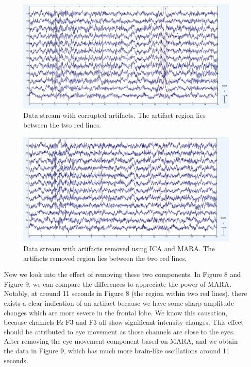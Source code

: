 \documentclass[a4paper,11pt,oneside]{article}
\begin{document}
		\begin{figure}[!h]
			\begin{center}
				\includegraphics[width=\textwidth]{img/art}
			\end{center}
			\caption{Data stream with corrupted artifacts. The artifact region lies between the two red lines.}
		\end{figure}
				\begin{figure}[!h]
		\begin{center}
			\includegraphics[width=\textwidth]{img/artrm}
		\end{center}
		\caption{Data stream with artifacts removed using ICA and MARA. The artifacts removed region lies between the two red lines.}
	\end{figure}
	Now we look into the effect of removing these two components. In Figure 8 and Figure 9, we can compare the differences to appreciate the power of MARA. Notably, at around 11 seconds in Figure 8 (the region within two red lines), there exists a clear indication of an artifact because we have some sharp amplitude changes which are more severe in the frontal lobe. We know this causation, because channels Fz F3 and F3 all show significant intensity changes. This effect should be attributed to eye movement as those channels are close to the eyes. After removing the eye movement component based on MARA, and we obtain the data in Figure 9, which has much more brain-like oscillations around 11 seconds.
	
\end{document}
